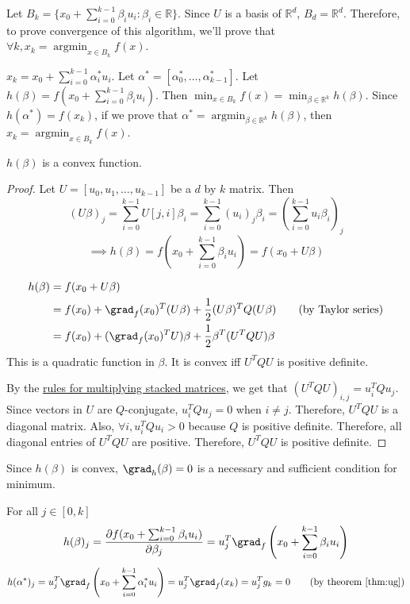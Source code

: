 Let $B_k = \{x_0 + \sum_{i=0}^{k-1} \beta_i u_i : \beta_i \in \mathbb{R} \}$.
Since $U$ is a basis of $\mathbb{R}^d$, $B_d = \mathbb{R}^d$.
Therefore, to prove convergence of this algorithm,
we'll prove that $\forall k, x_k = \operatorname{argmin}_{x \in B_k} f(x)$.

$x_k = x_0 + \sum_{i=0}^{k-1} \alpha_i^* u_i$.
Let $\alpha^* = [\alpha_0^*, \ldots, \alpha_{k-1}^*]$.
Let $h(\beta) = f(x_0 + \sum_{i=0}^{k-1} \beta_i u_i)$.
Then $\min_{x \in B_k} f(x) = \min_{\beta \in \mathbb{R}^k} h(\beta)$.
Since $h(\alpha^*) = f(x_k)$, if we prove that
$\alpha^* = \operatorname{argmin}_{\beta \in \mathbb{R}^k} h(\beta)$,
then $x_k = \operatorname{argmin}_{x \in B_k} f(x)$.

\begin{theorem} $h(\beta)$ is a convex function. \end{theorem}
\begin{proof}
Let $U = [u_0, u_1, \ldots, u_{k-1}]$ be a $d$ by $k$ matrix. Then
\[ (U\beta)_j = \sum_{i=0}^{k-1} U[j, i] \beta_i
= \sum_{i=0}^{k-1} (u_i)_j \beta_i = \left( \sum_{i=0}^{k-1} u_i \beta_i \right)_j \]
\[ \implies h(\beta) = f\left(x_0 + \sum_{i=0}^{k-1} \beta_i u_i \right) = f(x_0 + U\beta) \]

\begin{align*}
h(\beta) &= f(x_0 + U\beta)
\\ &= f(x_0) + \grad_f(x_0)^T(U\beta) + \frac{1}{2}(U\beta)^T Q (U\beta) \tag{by Taylor series}
\\ &= f(x_0) + (\grad_f(x_0)^TU)\beta + \frac{1}{2}\beta^T (U^TQU) \beta
\end{align*}
This is a quadratic function in $\beta$.
It is convex iff $U^TQU$ is positive definite.

By the \href{https://sharmaeklavya2.github.io/theoremdep/nodes/linear-algebra/matrices/stacking/product.html}
{rules for multiplying stacked matrices}, we get that $(U^TQU)_{i,j} = u_i^TQu_j$.
Since vectors in $U$ are $Q$-conjugate, $u_i^TQu_j = 0$ when $i \neq j$.
Therefore, $U^TQU$ is a diagonal matrix.
Also, $\forall i, u_i^TQu_i > 0$ because $Q$ is positive definite.
Therefore, all diagonal entries of $U^TQU$ are positive.
Therefore, $U^TQU$ is positive definite.
\end{proof}

Since $h(\beta)$ is convex, $\grad_h(\beta) = 0$ is a necessary and sufficient condition for minimum.

For all $j \in [0, k]$
\[ h(\beta)_j = \frac{\partial f(x_0 + \sum_{i=0}^{k-1} \beta_i u_i)}{\partial \beta_j}
= u_j^T \grad_f\left(x_0 + \sum_{i=0}^{k-1} \beta_i u_i \right) \]
\[ h(\alpha^*)_j = u_j^T \grad_f\left(x_0 + \sum_{i=0}^{k-1} \alpha_i^* u_i \right)
= u_j^T \grad_f(x_k) = u_j^Tg_k = 0 \tag{by theorem \ref{thm:ug}} \]

